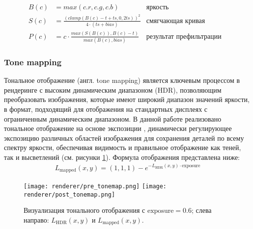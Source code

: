 \begin{align}
    B( c ) &= max( c.r, c.g, c.b ) & \text{яркость}&\\
    S( c ) &= \frac{ ( clamp( B( c ) - t + t s,  0,  2 t s ) )^2 }{ 4 \cdot (t s + bias) } & \text{смягчающая кривая}&\\
    P( c ) &= c \cdot \frac{ max( S (B(c)), B(c) - t ) }{max(B(c), bias)} & \text{результат префильтрации}\label{eq:bloom_prefilter_config}
\end{align}

\subsubsection{Tone mapping}
Тональное отображение (англ. tone mapping) является ключевым процессом в рендеринге с высоким динамическим диапазоном (HDR), позволяющим преобразовать изображения, которые имеют широкий диапазон значений яркости, в формат, подходящий для отображения на стандартных дисплеях с ограниченным динамическим диапазоном. В данной работе реализовано тональное отображение на основе экспозиции \cite{tone_mapping}, динамически регулирующее экспозицию различных областей изображения для сохранения деталей по всему спектру яркости, обеспечивая видимость и правильное отображение как теней, так и высветлений (см. рисунки \ref{fig:tone_map_vis}). Формула отображения представлена ниже:
\begin{align}
    L_{\text{mapped}}(x, y) = \left( 1, 1, 1 \right) - e^{-L_{\text{HDR}}(x, y) \cdot \text{exposure}}
\end{align}

\begin{figure}[h]
    \texttt{[image: renderer/pre\_tonemap.png]}
    \texttt{[image: renderer/post\_tonemap.png]}
    \caption{Визуализация тонального отображения с $\text{exposure} = 0.6$; слева направо: $L_{\text{HDR}}(x, y)$ и $L_{\text{mapped}}(x, y)$.}
    \label{fig:tone_map_vis}
\end{figure}

